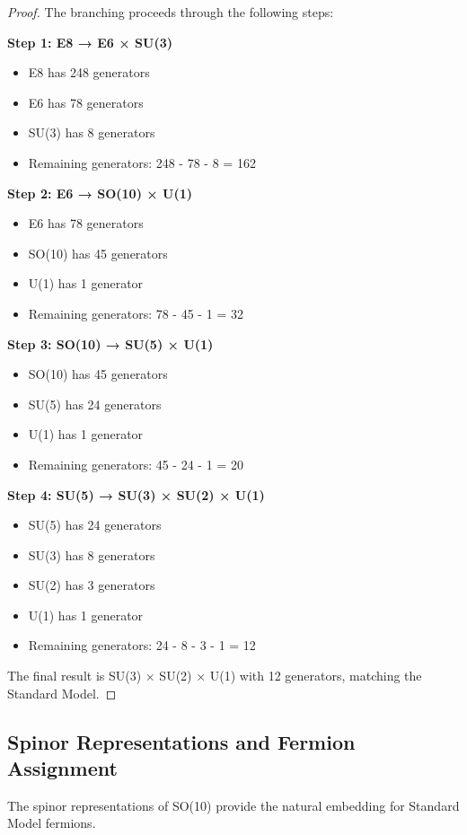 \documentclass[11pt]{article}
\theoremstyle{definition}
\begin{document}
\begin{proof}
The branching proceeds through the following steps:

\textbf{Step 1: E8 → E6 × SU(3)}
\begin{itemize}
\item E8 has 248 generators
\item E6 has 78 generators
\item SU(3) has 8 generators
\item Remaining generators: 248 - 78 - 8 = 162
\end{itemize}

\textbf{Step 2: E6 → SO(10) × U(1)}
\begin{itemize}
\item E6 has 78 generators
\item SO(10) has 45 generators
\item U(1) has 1 generator
\item Remaining generators: 78 - 45 - 1 = 32
\end{itemize}

\textbf{Step 3: SO(10) → SU(5) × U(1)}
\begin{itemize}
\item SO(10) has 45 generators
\item SU(5) has 24 generators
\item U(1) has 1 generator
\item Remaining generators: 45 - 24 - 1 = 20
\end{itemize}

\textbf{Step 4: SU(5) → SU(3) × SU(2) × U(1)}
\begin{itemize}
\item SU(5) has 24 generators
\item SU(3) has 8 generators
\item SU(2) has 3 generators
\item U(1) has 1 generator
\item Remaining generators: 24 - 8 - 3 - 1 = 12
\end{itemize}

The final result is SU(3) × SU(2) × U(1) with 12 generators, matching the Standard Model.
\end{proof}

\subsection{Spinor Representations and Fermion Assignment}

The spinor representations of SO(10) provide the natural embedding for Standard Model fermions.
\end{document}
